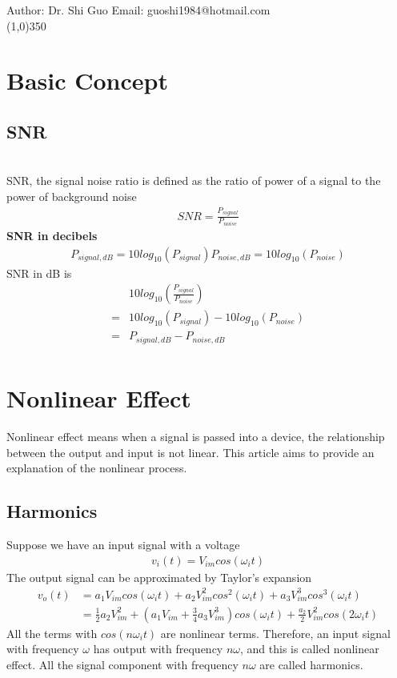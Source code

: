\documentclass[a4paper]{article}
\begin{document}
Author: Dr. Shi Guo  \hspace{30mm} Email: guoshi1984@hotmail.com\\
\line(1,0){350}
\section{Basic Concept}
\subsection{SNR}\\
SNR, the signal noise ratio is defined as the ratio of power of a signal to the power of background noise
\begin{align*}
	SNR = \frac{P_{signal}}{P_{noise}}
\end{align*}
{\bf SNR in decibels}\\
\begin{align*}
	P_{signal,dB} = 10 log_{10}(P_{signal})
	P_{noise,dB} = 10 log_{10}(P_{noise})
\end{align*}
SNR in dB is 
\begin{align*}
   & 10 log_{10}(\frac{P_{signal}}{P_{noise}}) \\
 = & 10 log_{10}(P_{signal}) - 10 log_{10}(P_{noise}) \\
 = & P_{signal, dB} - P_{noise, dB}\\
\end{align*}
\section{Nonlinear Effect}
Nonlinear effect means when a signal is passed into a device, the relationship between the output and input is not linear. This article aims to provide an explanation of the nonlinear process.
\subsection{Harmonics}
Suppose we have an input signal with a voltage 
\begin{align*}
	v_i(t) = V_{im} cos (\omega_i t)
\end{align*}
The output  signal can be approximated by Taylor's expansion
\begin{align*}
	v_o(t) & = a_1 V_{im} cos(\omega_i t) + a_2 V^2_{im} cos^2(\omega_i t) + a_3 V^3_{im} cos^3(\omega_i t)\\
	     & = \frac{1}{2} a_2 V^2_{im} +(a_1 V_{im} + \frac{3}{4} a_3 V^3_{im}) cos(\omega_i t) + \frac{a_2}{2} V^2_{im} cos(2\omega_i t) 
\end{align*}
All the terms with $cos(n \omega_i t) $ are nonlinear terms. Therefore, an input signal with frequency $\omega$  has output with frequency $n \omega$, and this is called nonlinear effect. All the signal component with frequency $n \omega$ are called harmonics.
\end{document}
